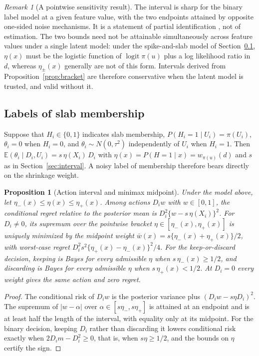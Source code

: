 \documentclass[11pt]{article}
\theoremstyle{plain}
\newtheorem{proposition}{Proposition}
\theoremstyle{definition}
\theoremstyle{remark}
\newtheorem{remark}{Remark}
\newcommand{\E}{\mathbb E}
\DeclareMathOperator{\logit}{logit}
\begin{document}
\begin{remark}[A pointwise sensitivity result]\label{rem:pointwise}
The interval is sharp for the binary label model at a given feature value, with the two
endpoints attained by opposite one-sided noise mechanisms. It is a statement of partial
identification \citep{manski2003partial}, not of estimation. The two bounds need not be
attainable simultaneously across feature values under a single latent model: under the
spike-and-slab model of Section~\ref{sec:membership}, $\eta(x)$ must be the logistic
function of $\logit\pi(u)$ plus a log likelihood ratio in $d$, whereas $\eta_\pm(x)$
generally are not of this form. Intervals derived from Proposition~\ref{prop:bracket} are
therefore conservative when the latent model is trusted, and valid without it.
\end{remark}

\subsection{Labels of slab membership}\label{sec:membership}

Suppose that $H_i\in\{0,1\}$ indicates slab membership, $P(H_i=1\mid U_i)=\pi(U_i)$,
$\theta_i=0$ when $H_i=0$, and $\theta_i\sim N(0,\tau^2)$ independently of $U_i$ when
$H_i=1$. Then $\E(\theta_i\mid D_i,U_i)=s\,\eta(X_i)\,D_i$ with $\eta(x)=P(H=1\mid x)=
w_{\pi(u)}(d)$ and $s$ as in Section~\ref{sec:interval}. A noisy label of membership
therefore bears directly on the shrinkage weight.

\begin{proposition}[Action interval and minimax midpoint]\label{prop:midpoint}
Under the model above, let $\eta_-(x)\le\eta(x)\le\eta_+(x)$. Among actions $D_iw$ with
$w\in[0,1]$, the conditional regret relative to the posterior mean is
$D_i^2\{w-s\,\eta(X_i)\}^2$. For $D_i\ne0$, its supremum over the pointwise bracket
$\eta\in[\eta_-(x),\eta_+(x)]$ is uniquely minimized by the midpoint weight $\bar w(x)=s\{\eta_-(x)+\eta_+(x)\}/2$, with worst-case
regret $D_i^2s^2\{\eta_+(x)-\eta_-(x)\}^2/4$. For the keep-or-discard decision, keeping is
Bayes for every admissible $\eta$ when $s\,\eta_-(x)\ge1/2$, and discarding is Bayes for
every admissible $\eta$ when $s\,\eta_+(x)<1/2$. At $D_i=0$ every weight gives the same
action and zero regret.
\end{proposition}

\begin{proof}
The conditional risk of $D_iw$ is the posterior variance plus $(D_iw-s\eta D_i)^2$. The
supremum of $|w-\alpha|$ over $\alpha\in[s\eta_-,s\eta_+]$ is attained at an endpoint and
is at least half the length of the interval, with equality only at its midpoint. For the
binary decision, keeping $D_i$ rather than discarding it lowers conditional risk exactly
when $2D_im-D_i^2\ge0$, that is, when $s\eta\ge1/2$, and the bounds on $\eta$ certify the
sign.
\end{proof}
\end{document}
